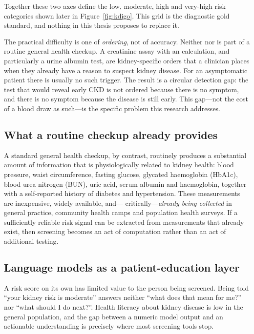 Together these two axes define the low, moderate, high and very-high risk
categories shown later in Figure~\ref{fig:kdigo}. This grid is the diagnostic
gold standard, and nothing in this thesis proposes to replace it.

The practical difficulty is one of \emph{ordering}, not of accuracy. Neither
\eGFR{} nor \UACR{} is part of a routine general health checkup. A creatinine
assay with an \eGFR{} calculation, and particularly a urine albumin test, are
kidney-specific orders that a clinician places when they already have a reason
to suspect kidney disease. For an asymptomatic patient there is usually no such
trigger. The result is a circular detection gap: the test that would reveal
early CKD is not ordered because there is no symptom, and there is no symptom
because the disease is still early. This gap---not the cost of a blood draw as
such---is the specific problem this research addresses.

\subsection{What a routine checkup already provides}

A standard general health checkup, by contrast, routinely produces a
substantial amount of information that is physiologically related to kidney
health: blood pressure, waist circumference, fasting glucose, glycated
haemoglobin (HbA1c), blood urea nitrogen (BUN), uric acid, serum albumin and
haemoglobin, together with a self-reported history of diabetes and
hypertension. These measurements are inexpensive, widely available, and---
critically---\emph{already being collected} in general practice, community
health camps and population health surveys. If a sufficiently reliable risk
signal can be extracted from measurements that already exist, then screening
becomes an act of computation rather than an act of additional testing.

\subsection{Language models as a patient-education layer}

A risk score on its own has limited value to the person being screened. Being
told ``your kidney risk is moderate'' answers neither ``what does that mean for
me?'' nor ``what should I do next?''. Health literacy about kidney disease is
low in the general population, and the gap between a numeric model output and
an actionable understanding is precisely where most screening tools stop.

